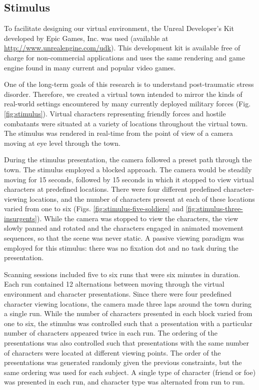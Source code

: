 \documentclass[5p,authoryear]{elsarticle}
\begin{document}
\subsection{Stimulus}
To facilitate designing our virtual environment, the Unreal Developer's Kit developed by Epic Games, Inc. was used (available at \url{http://www.unrealengine.com/udk}).
This development kit is available free of charge for non-commercial applications and uses the same rendering and game engine found in many current and popular video games.

One of the long-term goals of this research is to understand post-traumatic stress disorder.
Therefore, we created a virtual town intended to mirror the kinds of real-world settings encountered by many currently deployed military forces (Fig. \ref{fig:stimulus}).
Virtual characters representing friendly forces and hostile combatants were situated at a variety of locations throughout the virtual town.
The stimulus was rendered in real-time from the point of view of a camera moving at eye level through the town. 

During the stimulus presentation, the camera followed a preset path through the town.
The stimulus employed a blocked approach. The camera would be steadily moving for 15 seconds, followed by 15 seconds in which it stopped to view virtual characters at predefined locations.
There were four different predefined character-viewing locations, and the number of characters present at each of these locations varied from one to six (Figs. \ref{fig:stimulus-five-soldiers} and \ref{fig:stimulus-three-insurgents}).
While the camera was stopped to view the characters, the view slowly panned and rotated and the characters engaged in animated movement sequences, so that the scene was never static.
A passive viewing paradigm was employed for this stimulus: there was no fixation dot and no task during the presentation.

Scanning sessions included five to six runs that were six minutes in duration.
Each run contained 12 alternations between moving through the virtual environment and character presentations. 
Since there were four predefined character viewing locations, the camera made three laps around the town during a single run.
While the number of characters presented in each block varied from one to six, the stimulus was controlled such that a presentation with a particular number of characters appeared twice in each run.
The ordering of the presentations was also controlled such that presentations with the same number of characters were located at different viewing points.
The order of the presentations was generated randomly given the previous constraints, but the same ordering was used for each subject.
A single type of character (friend or foe) was presented in each run, and character type was alternated from run to run.
\end{document}
